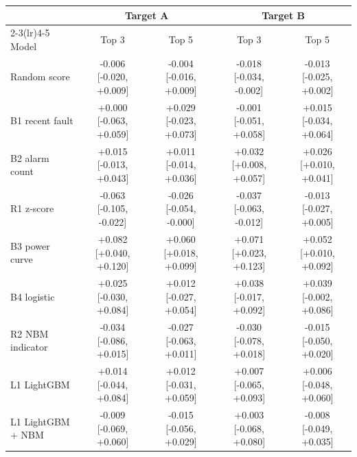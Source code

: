 \begin{tabular}{@{}lcccc@{}}
\toprule
 & \multicolumn{2}{c}{Target A} & \multicolumn{2}{c}{Target B} \\
\cmidrule(lr){2-3}\cmidrule(lr){4-5}
Model & Top 3 & Top 5 & Top 3 & Top 5 \\
\midrule
Random score & -0.006 [-0.020, +0.009] & -0.004 [-0.016, +0.009] & -0.018 [-0.034, -0.002] & -0.013 [-0.025, +0.002] \\
B1 recent fault & +0.000 [-0.063, +0.059] & +0.029 [-0.023, +0.073] & -0.001 [-0.051, +0.058] & +0.015 [-0.034, +0.064] \\
B2 alarm count & +0.015 [-0.013, +0.043] & +0.011 [-0.014, +0.036] & +0.032 [+0.008, +0.057] & +0.026 [+0.010, +0.041] \\
R1 z-score & -0.063 [-0.105, -0.022] & -0.026 [-0.054, -0.000] & -0.037 [-0.063, -0.012] & -0.013 [-0.027, +0.005] \\
B3 power curve & +0.082 [+0.040, +0.120] & +0.060 [+0.018, +0.099] & +0.071 [+0.023, +0.123] & +0.052 [+0.010, +0.092] \\
B4 logistic & +0.025 [-0.030, +0.084] & +0.012 [-0.027, +0.054] & +0.038 [-0.017, +0.092] & +0.039 [-0.002, +0.086] \\
R2 NBM indicator & -0.034 [-0.086, +0.015] & -0.027 [-0.063, +0.011] & -0.030 [-0.078, +0.018] & -0.015 [-0.050, +0.020] \\
L1 LightGBM & +0.014 [-0.044, +0.084] & +0.012 [-0.031, +0.059] & +0.007 [-0.065, +0.093] & +0.006 [-0.048, +0.060] \\
L1 LightGBM + NBM & -0.009 [-0.069, +0.060] & -0.015 [-0.056, +0.029] & +0.003 [-0.068, +0.080] & -0.008 [-0.049, +0.035] \\
\bottomrule
\end{tabular}
